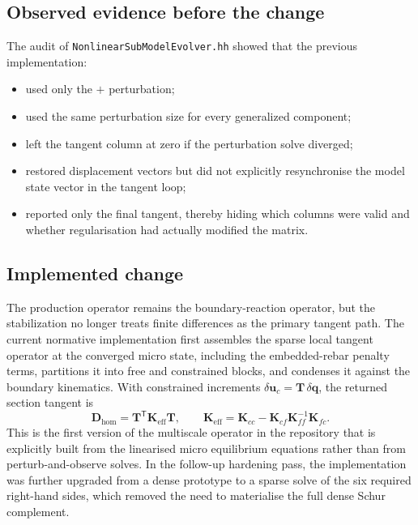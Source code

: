 \subsection{Observed evidence before the change}

The audit of \texttt{NonlinearSubModelEvolver.hh} showed that the previous
implementation:
\begin{itemize}
  \item used only the \(+\) perturbation;
  \item used the same perturbation size for every generalized component;
  \item left the tangent column at zero if the perturbation solve diverged;
  \item restored displacement vectors but did not explicitly resynchronise the
    model state vector in the tangent loop;
  \item reported only the final tangent, thereby hiding which columns were
    valid and whether regularisation had actually modified the matrix.
\end{itemize}

\subsection{Implemented change}

The production operator remains the boundary-reaction operator, but the
stabilization no longer treats finite differences as the primary tangent path.
The current normative implementation first assembles the sparse local tangent
operator at the converged micro state, including the embedded-rebar penalty
terms, partitions it into free and constrained blocks, and condenses it
against the boundary kinematics.  With constrained increments
\(\delta \mathbf{u}_c = \mathbf{T}\,\delta \mathbf{q}\), the returned section
tangent is
\begin{equation}
  \mathbf{D}_{\mathrm{hom}}
  =
  \mathbf{T}^{\mathsf T}
  \mathbf{K}_{\mathrm{eff}}
  \mathbf{T},
  \qquad
  \mathbf{K}_{\mathrm{eff}}
  =
  \mathbf{K}_{cc}
  -
  \mathbf{K}_{cf}\mathbf{K}_{ff}^{-1}\mathbf{K}_{fc}.
\end{equation}
This is the first version of the multiscale operator in the repository that is
explicitly built from the linearised micro equilibrium equations rather than
from perturb-and-observe solves.  In the follow-up hardening pass, the
implementation was further upgraded from a dense prototype to a sparse solve of
the six required right-hand sides, which removed the need to materialise the
full dense Schur complement.

